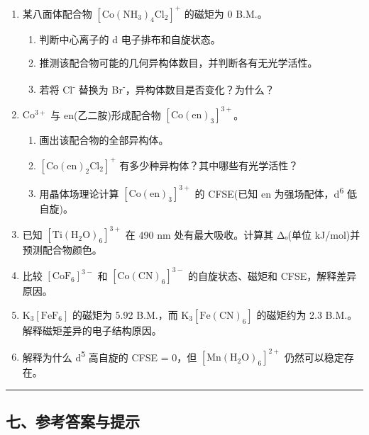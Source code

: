 \begin{enumerate}
\def\labelenumi{\arabic{enumi}.}
\setcounter{enumi}{9}
\item
  某八面体配合物 \(\mathrm{[Co(NH_3)_4Cl_2]^+}\) 的磁矩为 0 B.M.。

  \begin{enumerate}
  \def\labelenumii{(\arabic{enumii})}
  \tightlist
  \item
    判断中心离子的 d 电子排布和自旋状态。
  \item
    推测该配合物可能的几何异构体数目，并判断各有无光学活性。
  \item
    若将 Cl\textsuperscript{-} 替换为 Br\textsuperscript{-}，异构体数目是否变化？为什么？
  \end{enumerate}
\item
  \(\mathrm{Co^{3+}}\) 与 en(乙二胺)形成配合物 \(\mathrm{[Co(en)_3]^{3+}}\)。

  \begin{enumerate}
  \def\labelenumii{(\arabic{enumii})}
  \tightlist
  \item
    画出该配合物的全部异构体。
  \item
    \(\mathrm{[Co(en)_2Cl_2]^+}\) 有多少种异构体？其中哪些有光学活性？
  \item
    用晶体场理论计算 \(\mathrm{[Co(en)_3]^{3+}}\) 的 CFSE(已知 en 为强场配体，d\textsuperscript{6} 低自旋)。
  \end{enumerate}
\item
  已知 \(\mathrm{[Ti(H_2O)_6]^{3+}}\) 在 490 nm 处有最大吸收。计算其 Δₒ(单位 kJ/mol)并预测配合物颜色。
\item
  比较 \([\mathrm{CoF_6}]^{3-}\) 和 \([\mathrm{Co(CN)_6}]^{3-}\) 的自旋状态、磁矩和 CFSE，解释差异原因。
\item
  \(\mathrm{K_3[FeF_6]}\) 的磁矩为 5.92 B.M.，而 \(\mathrm{K_3[Fe(CN)_6]}\) 的磁矩约为 2.3 B.M.。解释磁矩差异的电子结构原因。
\item
  解释为什么 d\textsuperscript{5} 高自旋的 CFSE = 0，但 \([\mathrm{Mn(H_2O)_6}]^{2+}\) 仍然可以稳定存在。
\end{enumerate}

\begin{center}\rule{0.5\linewidth}{0.5pt}\end{center}

\subsection{七、参考答案与提示}\label{ux4e03ux53c2ux8003ux7b54ux6848ux4e0eux63d0ux793a}

